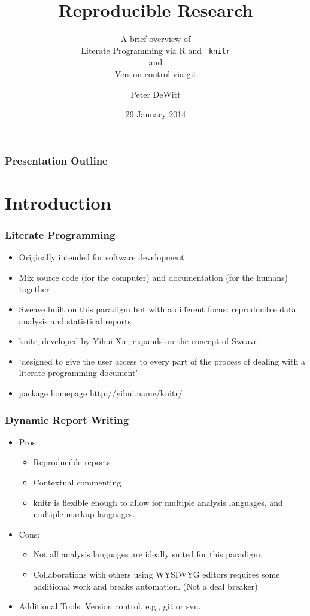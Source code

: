 \documentclass[t]{beamer}\usepackage[]{graphicx}\usepackage[]{color}
\title[Reproducible Research]{Reproducible Research}
\subtitle{A brief overview of\\Literate Programming via R and {\tt
knitr}\\and\\Version control via git}
\author{Peter DeWitt}
\institute{University of Colorado Anschutz Medical Campus 
 
Department of Biostatistics}
\date{29 January 2014}
\begin{document}
\begin{frame}[fragile]
  \titlepage
\end{frame}

\section*{} 
\begin{frame}
  \frametitle{Presentation Outline}
  \tableofcontents
\end{frame}

\section{Introduction}
\begin{frame}[fragile] 
  \frametitle{Literate Programming}
  \begin{itemize}
    \item Originally intended for software development
    \item Mix source code (for the computer) and documentation (for the humans)
      together
    \item Sweave built on this paradigm but with a different focus:
      reproducible data analysis and statistical reports.
    \item knitr, developed by Yihui Xie, expands on the concept of Sweave.
    \item `designed to give the user access to every part of the process of
      dealing with a literate programming document'
    \item package homepage \url{http://yihui.name/knitr/}
  \end{itemize}
\end{frame}

\begin{frame} 
  \frametitle{Dynamic Report Writing}
  \begin{itemize}
    \item Pros: 
      \begin{itemize}
        \item Reproducible reports 
        \item Contextual commenting 
        \item knitr is flexible enough to allow for multiple analysis languages,
          and multiple markup languages.
      \end{itemize}
    \item Cons:
      \begin{itemize}
        \item Not all analysis languages are ideally suited for this paradigm.
        \item Collaborations with others using WYSIWYG editors requires some
          additional work and breaks automation. (Not a deal breaker)
      \end{itemize}
    \item Additional Tools: Version control, e.g., git or svn.
  \end{itemize}
\end{frame}
\end{document}
